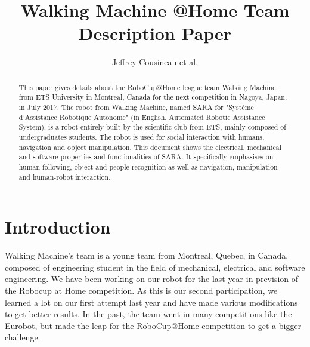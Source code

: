 \documentclass[runningheads,a4paper]{llncs}
\begin{document}
\title{Walking Machine @Home \newline {} Team Description Paper}

\author{Jeffrey Cousineau et al.}
\maketitle



\begin{abstract}

This paper gives details about the RoboCup@Home league team Walking Machine, from ETS University in Montreal, Canada for the next competition in Nagoya, Japan, in July 2017. The robot from Walking Machine, named SARA for "Système d’Assistance Robotique Autonome" (in English, Automated Robotic Assistance System), is a robot entirely built by the scientific club from ETS, mainly composed of undergraduates students. The robot is used for social interaction with humans, navigation and object manipulation. This document shows the electrical, mechanical and software properties and functionalities of SARA. It specifically emphasises on human following, object and people recognition as well as navigation, manipulation and human-robot interaction.

\end{abstract}


\section{Introduction}
\tab Walking Machine’s team is a young team from Montreal, Quebec, in Canada, composed of engineering student in the field of mechanical, electrical and software engineering. We have been working on our robot for the last year in prevision of the Robocup at Home competition. As this is our second participation, we learned a lot on our first attempt last year and have made various modifications to get better results. In the past, the team went in many competitions like the Eurobot, but made the leap for the RoboCup@Home competition to get a bigger challenge. \\
\end{document}
